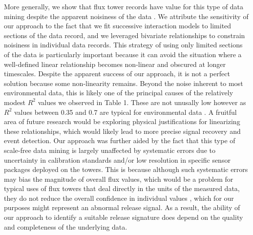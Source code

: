 \documentclass{article}
\begin{document}
More generally, we show that flux tower records have value for this type of data mining despite the apparent noisiness of the data \citep[e.g., ][]{fratiniEddyCovarianceFlux2018}. We attribute the sensitivity of our approach to the fact that we fit successive interaction models to limited sections of the data record, and we leveraged bivariate relationships to constrain noisiness in individual data records. This strategy of using only limited sections of the data is particularly important because it can avoid the situation where a well-defined linear relationship becomes non-linear and obscured at longer timescales. Despite the apparent success of our approach, it is not a perfect solution because some non-linearity remains. Beyond the noise inherent to most environmental data, this is likely one of the principal causes of the relatively modest $R^2$ values we observed in Table 1. These are not unusally low however as $R^2$ values between 0.35 and 0.7 are typical for environmental data \citep{murrayMethodsQuantifyVariable2009}. A fruitful area of future research would be exploring physical justifications for linearizing these relationships, which would likely lead to more precise signal recovery and event detection. Our approach was further aided by the fact that this type of scale-free data mining is largely unaffected by systematic errors due to uncertainty in calibration standards and/or low resolution in specific sensor packages deployed on the towers. This is because although such systematic errors may bias the magnitude of overall flux values, which would be a problem for typical uses of flux towers that deal directly in the units of the measured data, they do not reduce the overall confidence in individual values \citep{langfordEddycovarianceDataLow2015}, which for our purposes might represent an abnormal release signal. As a result, the ability of our approach to identify a suitable release signature does depend on the quality and completeness of the underlying data.
\end{document}
